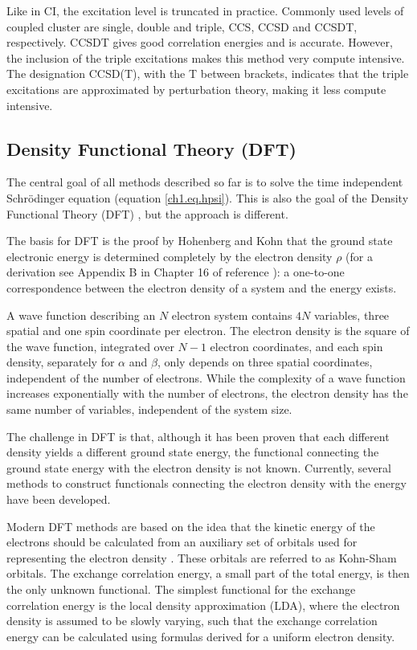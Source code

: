 Like in CI, the excitation level is truncated in practice. Commonly used levels of coupled cluster are single, double and triple, CCS, CCSD and CCSDT, respectively. CCSDT gives good correlation energies and is accurate. However, the inclusion of the triple excitations makes this method very compute intensive. The designation CCSD(T), with the T between brackets, indicates that the triple excitations are approximated by perturbation theory, making it less compute intensive.

\subsection{Density Functional Theory (DFT)}
The central goal of all methods described so far is to solve the time independent Schr\"{o}dinger equation (equation \ref{ch1.eq.hpsi}). This is also the goal of the Density Functional Theory (DFT) \cite{jensen, hohenberg, kohnsham}, but the approach is different. 

The basis for DFT is the proof by Hohenberg and Kohn \cite{hohenberg} that the ground state electronic energy is determined completely by the electron density $\rho$ (for a derivation see Appendix B in Chapter 16 of reference \cite{jensen}): a one-to-one correspondence between the electron density of a system and the energy exists.

A wave function describing an $N$ electron system contains $4N$ variables, three spatial and one spin coordinate per electron. The electron density is the square of the wave function, integrated over $N - 1$ electron coordinates, and each spin density, separately for $\alpha$ and $\beta$, only depends on three spatial coordinates, independent of the number of electrons. While the complexity of a wave function increases exponentially with the number of electrons, the electron density has the same number of variables, independent of the system size.

The challenge in DFT is that, although it has been proven that each different density yields a different ground state energy, the functional connecting the ground state energy with the electron density is not known. Currently, several methods to construct functionals connecting the electron density with the energy have been developed.

Modern DFT methods are based on the idea that the kinetic energy of the electrons should be calculated from an auxiliary
set of orbitals used for representing the electron density \cite{kohnsham}. These orbitals are referred to as Kohn-Sham orbitals. The exchange correlation energy, a small part of the total energy, is then the only unknown functional. The simplest functional for the exchange correlation energy is the local density approximation (LDA), where the electron density is assumed to be slowly varying, such that the exchange correlation energy can be calculated using formulas derived for a uniform electron density.

